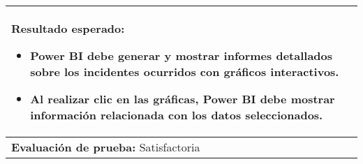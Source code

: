 \begin{longtable}{|p{6.7cm}|p{6.7cm}|}
    \multicolumn{2}{|p{13.4cm}|}{\textbf{Resultado esperado:}
    \begin{itemize}
        \item Power BI debe generar y mostrar informes detallados sobre los incidentes ocurridos con gráficos interactivos.
        \item Al realizar clic en las gráficas, Power BI debe mostrar información relacionada con los datos seleccionados.
    \end{itemize}}                                           \\
    \hline
    \multicolumn{2}{|p{13.4cm}|}{\textbf{Evaluación de prueba:} Satisfactoria}                                                                                   \\
    \hline
\end{longtable}
